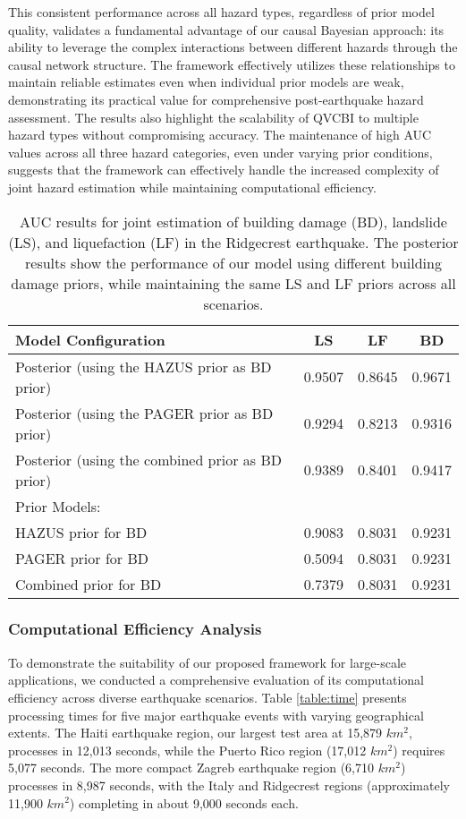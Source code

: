 \documentclass[review]{elsarticle}
\begin{document}
This consistent performance across all hazard types, regardless of prior model quality, validates a fundamental advantage of our causal Bayesian approach: its ability to leverage the complex interactions between different hazards through the causal network structure. The framework effectively utilizes these relationships to maintain reliable estimates even when individual prior models are weak, demonstrating its practical value for comprehensive post-earthquake hazard assessment. The results also highlight the scalability of QVCBI to multiple hazard types without compromising accuracy. The maintenance of high AUC values across all three hazard categories, even under varying prior conditions, suggests that the framework can effectively handle the increased complexity of joint hazard estimation while maintaining computational efficiency.
 


 \begin{table*}[t]
\caption{AUC results for joint estimation of building damage (BD), landslide (LS), and liquefaction (LF) in the Ridgecrest earthquake. The posterior results show the performance of our model using different building damage priors, while maintaining the same LS and LF priors across all scenarios.}
\begin{center}
\begin{tabular}{l|ccc}
\toprule
Model Configuration & LS & LF & BD \\
\toprule
Posterior (using the HAZUS prior as BD prior) & 0.9507 & 0.8645 & 0.9671 \\
Posterior (using the PAGER prior as BD prior) & 0.9294 & 0.8213 & 0.9316 \\
Posterior (using the combined prior as BD prior) & 0.9389 & 0.8401 & 0.9417 \\
\toprule
Prior Models: & & & \\
\toprule
HAZUS prior for BD & 0.9083 & 0.8031 & 0.9231 \\
PAGER prior for BD & 0.5094 & 0.8031 & 0.9231 \\
Combined prior for BD & 0.7379 & 0.8031 & 0.9231 \\
\toprule
\end{tabular}
\end{center}
\label{RC_LSLFAUC}
\end{table*}


\subsubsection{Computational Efficiency Analysis}
To demonstrate the suitability of our proposed framework for large-scale applications, we conducted a comprehensive evaluation of its computational efficiency across diverse earthquake scenarios. Table \ref{table:time} presents processing times for five major earthquake events with varying geographical extents. The Haiti earthquake region, our largest test area at 15,879 $km^{2}$, processes in 12,013 seconds, while the Puerto Rico region (17,012 $km^{2}$) requires 5,077 seconds. The more compact Zagreb earthquake region (6,710 $km^{2}$) processes in 8,987 seconds, with the Italy and Ridgecrest regions (approximately 11,900 $km^{2}$) completing in about 9,000 seconds each.
\end{document}
